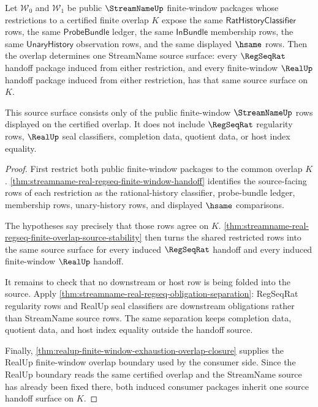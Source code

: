 \begin{theorem}
\label{thm:streamname-real-regseq-overlap-unique-source}
Let $\mathcal{W}_0$ and $\mathcal{W}_1$ be public $\StreamNameUp$
finite-window packages whose restrictions to a certified finite overlap $K$
expose the same $\mathsf{RatHistoryClassifier}$ rows, the same
$\mathsf{ProbeBundle}$ ledger, the same $\mathsf{InBundle}$ membership rows,
the same $\mathsf{UnaryHistory}$ observation rows, and the same displayed
$\hsame$ rows. Then the overlap determines one StreamName source surface:
every $\RegSeqRat$ handoff package induced from either restriction, and every
finite-window $\RealUp$ handoff package induced from either restriction, has
that same source surface on $K$.

This source surface consists only of the public finite-window
$\StreamNameUp$ rows displayed on the certified overlap. It does not include
$\RegSeqRat$ regularity rows, $\RealUp$ seal classifiers, completion data,
quotient data, or host index equality.
\end{theorem}
\begin{proof}
First restrict both public finite-window packages to the common overlap $K$.
\autoref{thm:streamname-real-regseq-finite-window-handoff} identifies the
source-facing rows of each restriction as the rational-history classifier,
probe-bundle ledger, membership rows, unary-history rows, and displayed
$\hsame$ comparisons.

The hypotheses say precisely that those rows agree on $K$.
\autoref{thm:streamname-real-regseq-finite-overlap-source-stability} then
turns the shared restricted rows into the same source surface for every
induced $\RegSeqRat$ handoff and every induced finite-window $\RealUp$
handoff.

It remains to check that no downstream or host row is being folded into the
source. Apply
\autoref{thm:streamname-real-regseq-obligation-separation}: RegSeqRat
regularity rows and RealUp seal classifiers are downstream obligations rather
than StreamName source rows. The same separation keeps completion data,
quotient data, and host index equality outside the handoff source.

Finally, \autoref{thm:realup-finite-window-exhaustion-overlap-closure}
supplies the RealUp finite-window overlap boundary used by the consumer side.
Since the RealUp boundary reads the same certified overlap and the StreamName
source has already been fixed there, both induced consumer packages inherit
one source handoff surface on $K$.
\end{proof}

